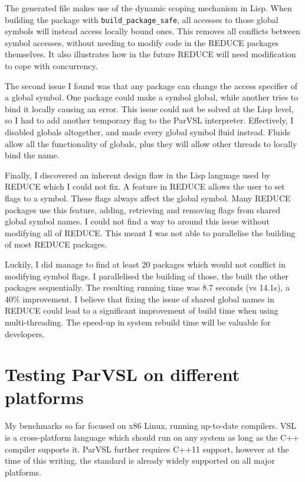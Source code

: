The generated file makes use of the dynamic scoping mechanism in Lisp. When building the package
with \texttt{build\_package\_safe}, all accesses to those global symbols will instead access locally
bound ones. This removes all conflicts between symbol accesses, without needing to modify code in
the REDUCE packages themselves. It also illustrates how in the future REDUCE will need modification
to cope with concurrency.

The second issue I found was that any package can change the access specifier of a global symbol.
One package could make a symbol global, while another tries to bind it locally causing an error.
This issue could not be solved at the Lisp level, so I had to add another temporary flag to the
ParVSL interpreter. Effectively, I disabled globals altogether, and made every global symbol
fluid instead. Fluids allow all the functionality of globals, plus they will allow other threads
to locally bind the name.

Finally, I discovered an inherent design flaw in the Lisp language used by REDUCE which I could not
fix. A feature in REDUCE allows the user to set flags to a symbol. These flags always affect the global
symbol. Many REDUCE packages use this feature, adding, retrieving and removing flags from shared
global symbol names. I could not find a way to around this issue without modifying all of REDUCE.
This meant I was not able to parallelise the building of most REDUCE packages.

Luckily, I did manage to find at least 20 packages which would not conflict in modifying symbol flags.
I parallelised the building of those, the built the other packages sequentially. The resulting
running time was 8.7 seconds (vs 14.1s), a 40\% improvement.
I believe that fixing the issue of shared global names in REDUCE could lead to a significant improvement
of build time when using multi-threading. The speed-up in system rebuild time will be valuable for
developers.

\section{Testing ParVSL on different platforms}
\label{sec:crossplatform}

My benchmarks so far focused on x86 Linux, running
up-to-date compilers. VSL is a cross-platform language which should run on any system as long as the
C++ compiler supports it. ParVSL further requires C++11 support, however at the
time of this writing, the standard is already widely supported on all major platforms.

